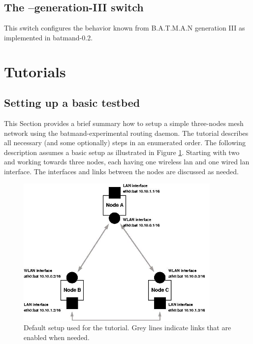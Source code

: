\documentclass[11pt]{article}
\begin{document}
\subsection{The --generation-III switch}
\label{sec:generation-III}

This switch configures the behavior known from B.A.T.M.A.N generation III as implemented in batmand-0.2.




\section{Tutorials}
\label{sec:howto}

\subsection{Setting up a basic testbed}
\label{sec:howto-basics}

This Section provides a brief summary how to setup a simple three-nodes mesh network using the batmand-experimental routing daemon.
%
The tutorial describes all necessary (and some optionally) steps in an enumerated order.
%
The following description assumes a basic setup as illustrated in Figure \ref{fig:howto-setup}.
Starting with two and working towards three nodes, each having one wireless lan and one wired lan interface. The interfaces and links between the nodes are discussed as needed.

\begin{figure}[htbp]
  \begin{center}
    \includegraphics[width=10cm]{tutorial-setup-x01.jpg}
    \caption{Default setup used for the tutorial. Grey lines indicate links that are enabled when needed.}
    \label{fig:howto-setup}
  \end{center}
\end{figure}
\end{document}
